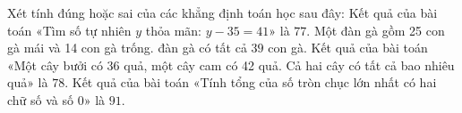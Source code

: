 \begin{ex} %
Xét tính đúng hoặc sai của các khẳng định toán học sau đây:
\choiceTF
{Kết quả của bài toán «Tìm số tự nhiên $y$ thỏa mãn: $y - 35 = 41$» là $77$.}
{\True Một đàn gà gồm 25 con gà mái và 14 con gà trống. đàn gà có tất cả $39$ con gà.}
{\True Kết quả của bài toán «Một cây bưởi có 36 quả, một cây cam có 42 quả. Cả hai cây có tất cả bao nhiêu quả» là $78$.}
{Kết quả của bài toán «Tính tổng của số tròn chục lớn nhất có hai chữ số và số 0» là $91$.}
\end{ex}

